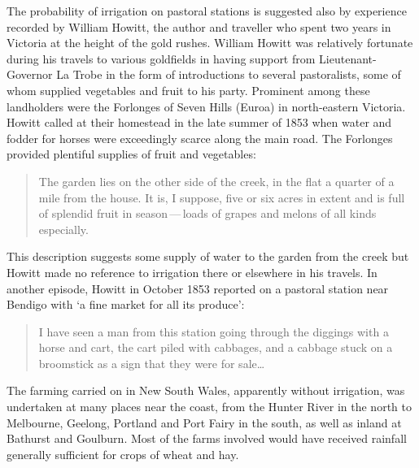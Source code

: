 The probability of irrigation on pastoral stations is suggested also
by experience recorded by William Howitt, the author and traveller who
spent two years in Victoria at the height of the gold rushes.  William
Howitt  was relatively fortunate during his
travels to various goldfields in having support from
Lieutenant-Governor La Trobe  in the form
of introductions to several pastoralists, some of whom supplied
vegetables and fruit to his party.  Prominent among these landholders
were the Forlonges
 of
Seven Hills  (Euroa)  in
north-eastern Victoria.  Howitt called at their homestead in the late
summer of 1853 when water and fodder for horses were exceedingly
scarce along the main road.  The Forlonges provided plentiful supplies
of fruit and vegetables:
\begin{quote}
	The garden lies on the other side of the creek, in the flat a
	quarter of a mile from the house. It is, I suppose, five or
	six acres in extent and is full of splendid fruit in
	season\,---\,loads of grapes and melons of all kinds
	especially.
\end{quote}

This description suggests some supply of water to the garden from the
creek but Howitt made no reference to irrigation there or elsewhere in
his travels.  In another episode, Howitt in October 1853 reported on a
pastoral station near Bendigo with `a fine market for all its
produce':
\begin{quote}
	I have seen a man from this station going through the diggings
	with a horse and cart, the cart piled with cabbages, and a
	cabbage stuck on a broomstick as a sign that they were for
	sale\ldots{}
\end{quote}

The farming carried on in New South Wales, apparently without
irrigation, was undertaken at many places near the coast, from the
Hunter River  in the north to Melbourne,
 Geelong,  
Portland  and Port Fairy
 in the south, as well as inland at Bathurst
 and
Goulburn.  Most of the farms involved would have
received rainfall generally sufficient for crops of wheat and hay.

